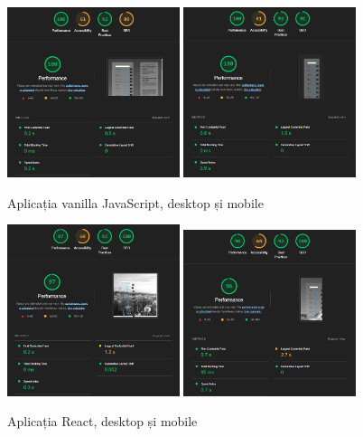 \documentclass[12pt, a4paper]{report}
\begin{document}
\begin{figure}[htbp]
	\centering
	\includegraphics[width=0.45\textwidth]{01_desktop_lighthouse.png}
	\includegraphics[width=0.45\textwidth]{01_mobile_lighthouse.png}
	\caption{Aplicația vanilla JavaScript, desktop și mobile}
	\label{fig:01-local-lighthouse}
\end{figure}

\begin{figure}[htbp]
	\centering
	\includegraphics[width=0.45\textwidth]{02_desktop_lighthouse.png}
	\includegraphics[width=0.45\textwidth]{02_mobile_lighthouse.png}
	\caption{Aplicația React, desktop și mobile}
	\label{fig:02-local-lighthouse}
\end{figure}
\end{document}

